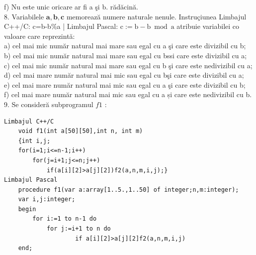 \documentclass[10pt]{article}
\begin{document}
f) Nu este unic oricare ar fi a şi b. rădăcină.\\
8. Variabilele $\mathbf{a}, \mathbf{b}, \mathbf{c}$ memorează numere naturale nenule. Instruçiunea Limbajul C++/C: c=b-b\%a | Limbajul Pascal: $\mathrm{c}:=\mathrm{b}-\mathrm{b} \bmod \mathrm{a}$ atribuie variabilei co valoare care reprezintă:\\
a) cel mai mic număr natural mai mare sau egal cu a şi care este divizibil cu b;\\
b) cel mai mic număr natural mai mare sau egal cu bssi care este divizibil cu a;\\
c) cel mai mic număr natural mai mare sau egal cu b şi care este nedivizibil cu a;\\
d) cel mai mare număr natural mai mic sau egal cu bşi care este divizibil cu a;\\
e) cel mai mare număr natural mai mic sau egal cu a şi care este divizibil cu b;\\
f) cel mai mare număr natural mai mic sau egal cu a și care este nedivizibil cu b.\\
9. Se consideră subprogramul $f 1$ :

\begin{verbatim}
Limbajul C++/C
    void f1(int a[50][50],int n, int m)
    {int i,j;
    for(i=1;i<=n-1;i++)
        for(j=i+1;j<=n;j++)
            if(a[i][2]>a[j][2])f2(a,n,m,i,j);}
Limbajul Pascal
    procedure f1(var a:array[1..5.,1..50] of integer;n,m:integer);
    var i,j:integer;
    begin
        for i:=1 to n-1 do
            for j:=i+1 to n do
                    if a[i][2]>a[j][2]f2(a,n,m,i,j)
    end;
\end{verbatim}
\end{document}
